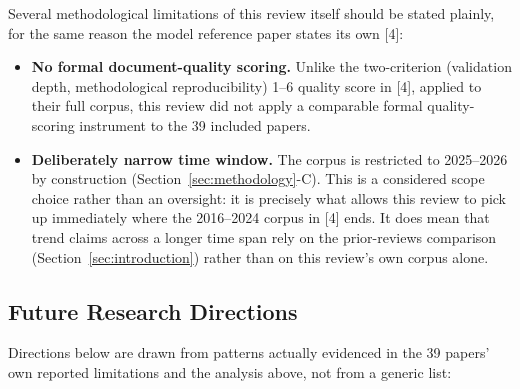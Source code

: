 \documentclass[journal]{IEEEtran}
\begin{document}
Several methodological limitations of this review itself should be stated plainly, for the same reason the model reference paper states its own [4]:

\begin{itemize}

\item \textbf{No formal document-quality scoring.} Unlike the two-criterion (validation depth, methodological reproducibility) 1--6 quality score in [4], applied to their full corpus, this review did not apply a comparable formal quality-scoring instrument to the 39 included papers.

\item \textbf{Deliberately narrow time window.} The corpus is restricted to 2025--2026 by construction (Section~\ref{sec:methodology}-C). This is a considered scope choice rather than an oversight: it is precisely what allows this review to pick up immediately where the 2016--2024 corpus in [4] ends. It does mean that trend claims across a longer time span rely on the prior-reviews comparison (Section~\ref{sec:introduction}) rather than on this review's own corpus alone.

\end{itemize}

\subsection{Future Research Directions}

Directions below are drawn from patterns actually evidenced in the 39 papers' own reported limitations and the analysis above, not from a generic list:
\end{document}
